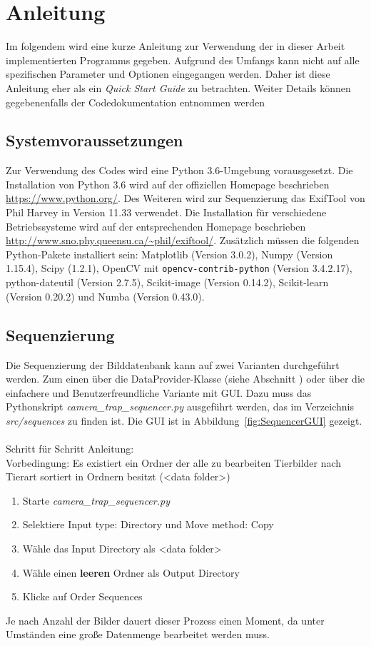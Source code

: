 \section*{Anleitung}
Im folgendem wird eine kurze Anleitung zur Verwendung der in dieser Arbeit implementierten Programms gegeben. Aufgrund des Umfangs kann nicht auf alle spezifischen Parameter und Optionen eingegangen werden. Daher ist diese Anleitung eher als ein \emph{Quick Start Guide} zu betrachten. Weiter Details können gegebenenfalls der Codedokumentation entnommen werden

\subsection*{Systemvoraussetzungen}
Zur Verwendung des Codes wird eine Python 3.6-Umgebung vorausgesetzt. Die Installation von Python 3.6 wird auf der offiziellen Homepage beschrieben \url{https://www.python.org/}. Des Weiteren wird zur Sequenzierung das ExifTool von Phil Harvey in Version 11.33 verwendet. Die Installation für verschiedene Betriebssysteme wird auf der entsprechenden Homepage beschrieben \url{http://www.sno.phy.queensu.ca/~phil/exiftool/}. Zusätzlich müssen die folgenden Python-Pakete installiert sein: Matplotlib (Version 3.0.2), Numpy (Version 1.15.4), Scipy (1.2.1),  OpenCV mit \texttt{opencv-contrib-python} (Version 3.4.2.17), python-dateutil (Version 2.7.5), Scikit-image (Version 0.14.2), Scikit-learn (Version 0.20.2) und Numba (Version 0.43.0).
\subsection*{Sequenzierung}
Die Sequenzierung der Bilddatenbank kann auf zwei Varianten durchgeführt werden. Zum einen über die DataProvider-Klasse (siehe Abschnitt ) oder über die einfachere und Benutzerfreundliche Variante mit GUI. Dazu muss das Pythonskript  \emph{camera\_trap\_sequencer.py} ausgeführt werden, das im Verzeichnis \emph{src/sequences} zu finden ist. Die GUI ist in Abbildung~\ref{fig:SequencerGUI} gezeigt. \\
\\
Schritt für Schritt Anleitung:\\
Vorbedingung: Es existiert ein Ordner der alle zu bearbeiten Tierbilder nach Tierart sortiert in Ordnern besitzt (<data folder>)
\begin{enumerate}
\item Starte \emph{camera\_trap\_sequencer.py}
\item Selektiere Input type: Directory und Move method: Copy
\item Wähle das Input Directory als <data folder>
\item Wähle einen \textbf{leeren} Ordner als Output Directory
\item Klicke auf Order Sequences
\end{enumerate}
Je nach Anzahl der Bilder dauert dieser Prozess einen Moment, da unter Umständen eine große Datenmenge bearbeitet werden muss.

